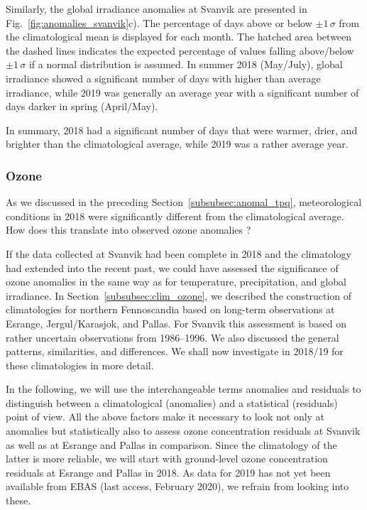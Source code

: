 \documentclass[bg, manuscript]{copernicus}
\begin{document}
Similarly, the global irradiance anomalies at Svanvik are presented in Fig.~\ref{fig:anomalies_svanvik}c). The percentage of days above or below $\pm 1\,\sigma$ from the climatological mean is displayed for each month. The hatched area between the dashed lines indicates the expected percentage of values falling above/below $\pm 1\,\sigma$ if a normal distribution is assumed. In summer 2018 (May/July), global irradiance showed a significant number of days with higher than average irradiance, while 2019 was generally an average year with a significant number of days darker in spring (April/May).

In summary, 2018 had a significant number of days that were warmer, drier, and brighter than the climatological average, while 2019 was a rather average year.

\subsubsection{Ozone}
\label{subsubsec:anomal_ozone}
As we discussed in the preceding Section~\ref{subsubsec:anomal_tpq}, meteorological conditions in 2018 were significantly different from the climatological average. How does this translate into observed ozone anomalies \chem{\Delta[O_3]}?

If the data collected at Svanvik had been complete in 2018 and the climatology had extended into the recent past, we could have assessed the significance of ozone anomalies in the same way as for temperature, precipitation, and global irradiance. In Section~\ref{subsubsec:clim_ozone}, we described the construction of climatologies for northern Fennoscandia based on long-term observations at Esrange, Jergul/Karasjok, and Pallas. For Svanvik this assessment is based on rather uncertain observations from 1986--1996. We also discussed the general patterns, similarities, and differences. We shall now investigate \chem{\Delta[O_3]} in 2018/19 for these climatologies in more detail.

In the following, we will use the interchangeable terms anomalies and residuals to distinguish between a climatological (anomalies) and a statistical (residuals) point of view.
All the above factors make it necessary to look not only at anomalies but statistically also to assess ozone concentration residuals at Svanvik as well as at Esrange and Pallas in comparison. Since the climatology of the latter is more reliable, we will start with ground-level ozone concentration residuals \chem{\Delta[O_3]} at Esrange and Pallas in 2018. As data for 2019 has not yet been available from EBAS (last access, February 2020), we refrain from looking into these.
\end{document}

